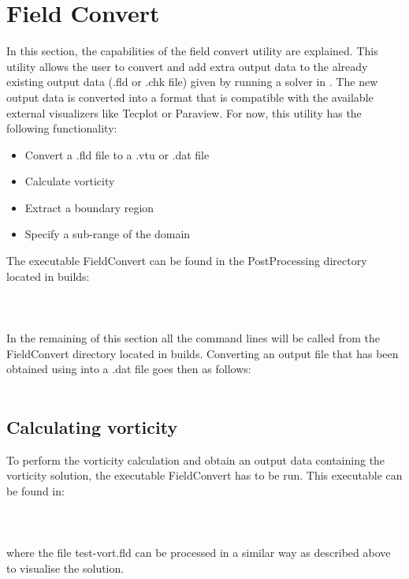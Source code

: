 \section{Field Convert}
In this section, the capabilities of the field convert utility are explained. This utility allows the user to convert and add extra output data to the already existing output data (.fld or .chk file) given by running a solver in \nekpp. The new output data is converted into a format that is compatible with the available external visualizers like Tecplot or Paraview. For now, this utility has the following functionality:
\begin{itemize}
\item Convert a .fld file to a .vtu or .dat file
\item Calculate vorticity
\item Extract a boundary region
\item Specify a sub-range of the domain
\end{itemize}
The executable FieldConvert can be found in the PostProcessing directory located in builds:\\
\\
\\
\\
In the remaining of this section all the command lines will be called from the FieldConvert directory located in builds. Converting an output file that has been obtained using \nekpp into a .dat file goes then as follows:\\
\\
\subsection{Calculating vorticity}
To perform the vorticity calculation and obtain an output data containing the vorticity solution, the executable FieldConvert has to be run. This executable can be found in:\\
\\
\\
\\
where the file test-vort.fld can be processed in a similar way as described above to visualise the solution.

